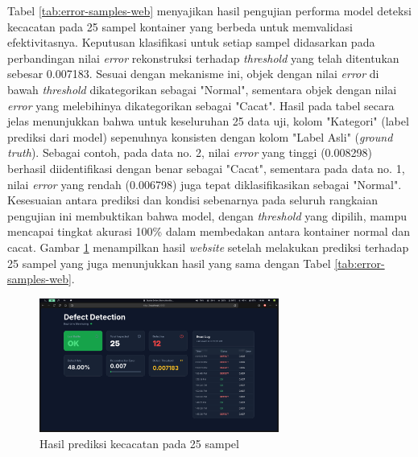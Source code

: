 Tabel \ref{tab:error-samples-web} menyajikan hasil pengujian
performa model deteksi kecacatan pada 25 sampel kontainer yang
berbeda untuk memvalidasi efektivitasnya. Keputusan klasifikasi untuk
setiap sampel didasarkan pada perbandingan nilai \textit{error} rekonstruksi
terhadap \textit{threshold} yang telah ditentukan sebesar
0.007183. Sesuai dengan mekanisme ini, objek dengan nilai \textit{error} di
bawah \textit{threshold} dikategorikan sebagai "Normal", sementara objek
dengan nilai \textit{error} yang melebihinya dikategorikan sebagai "Cacat".
Hasil pada tabel secara jelas menunjukkan bahwa untuk keseluruhan 25
data uji, kolom "Kategori" (label prediksi dari model) sepenuhnya
konsisten dengan kolom "Label Asli" (\textit{ground truth}). Sebagai
contoh, pada data no. 2, nilai \textit{error} yang tinggi (0.008298)
berhasil diidentifikasi dengan benar sebagai "Cacat", sementara pada
data no. 1, nilai \textit{error} yang rendah (0.006798) juga tepat
diklasifikasikan sebagai "Normal". Kesesuaian antara
prediksi dan kondisi sebenarnya pada seluruh rangkaian pengujian ini
membuktikan bahwa model, dengan \textit{threshold} yang dipilih, mampu
mencapai tingkat akurasi 100\% dalam membedakan antara kontainer
normal dan cacat. Gambar \ref{fig:web-25} menampilkan hasil \textit{website}
setelah melakukan prediksi terhadap 25 sampel yang juga menunjukkan
hasil yang sama dengan Tabel \ref{tab:error-samples-web}.

\begin{figure}[H]
  \centering
  \includegraphics[width=0.7\textwidth]{gambar/ss_web_25.png}
  \caption{Hasil prediksi kecacatan pada 25 sampel}
  \label{fig:web-25}
\end{figure}
\vspace{-1em}
